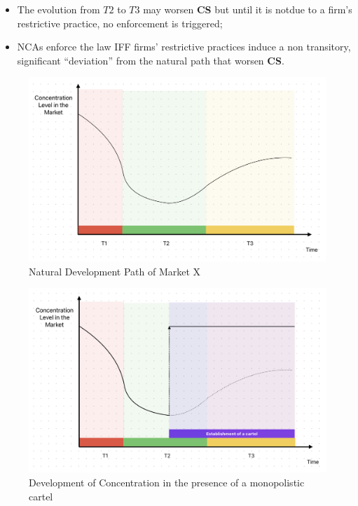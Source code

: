     \begin{itemize}
        \item The evolution from $T2$ to $T3$ may worsen \textcolor{BrickRed}{\textbf{CS}} but until it is notdue to a firm’s restrictive practice, no enforcement is triggered;
        \item NCAs enforce the law IFF firms’ restrictive practices induce a non transitory, significant “deviation” from the natural path that worsen \textcolor{BrickRed}{\textbf{CS}}.
    \end{itemize}

    \begin{figure}[h]
        \centering
        \includegraphics[width=0.85\linewidth]{graphics/L3-5_Market_evolution.png}
        \caption{Natural Development Path of Market X}
        \label{fig:nat_dev_path_mkt}
    \end{figure}

    \begin{figure}[h]
        \centering
        \includegraphics[width=0.85\linewidth]{graphics/L3-6_establishment_cartel.png}
        \caption{Development of Concentration in the presence of a monopolistic cartel}
    \end{figure}

